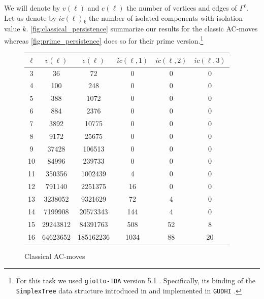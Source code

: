 We will denote by $v(\ell)$ and $e(\ell)$ the number of vertices and edges of $\Gamma^\ell$.
Let us denote by $ic(\ell)_k$ the number of isolated components with isolation value $k$.
\autoref{fig:classical_persistence} summarize our results for the classic AC-moves whereas \autoref{fig:prime_persistence} does so for their prime version.\footnote{For this task we used \texttt{giotto-TDA} version 5.1 \cite{tauzin2021giotto}.
	Specifically, its binding of the \texttt{SimplexTree} data structure introduced in \cite{boissonnat2014simplex} and implemented in \texttt{GUDHI} \cite{maria2014gudhi}.}

\begin{figure}
	\begin{tabular}{|c|c|c|c|c|c|}
		\hline
		$\ell$ & $v(\ell)$ & $e(\ell)$ & $ic(\ell,1)$ & $ic(\ell,2)$ & $ic(\ell,3)$ \\ \hline
		3 & 36 & 72 & 0 & 0 & 0 \\ \hline
		4 & 100 & 248 & 0 & 0 & 0 \\ \hline
		5 & 388 & 1072 & 0 & 0 & 0 \\ \hline
		6 & 884 & 2376 & 0 & 0 & 0 \\ \hline
		7 & 3892 & 10775 & 0 & 0 & 0 \\ \hline
		8 & 9172 & 25675 & 0 & 0 & 0 \\ \hline
		9 & 37428 & 106513 & 0 & 0 & 0 \\ \hline
		10 & 84996 & 239733 & 0 & 0 & 0 \\ \hline
		11 & 350356 & 1002439 & 4 & 0 & 0 \\ \hline
		12 & 791140 & 2251375 & 16 & 0 & 0 \\ \hline
		13 & 3238052 & 9321629 & 72 & 4 & 0 \\ \hline
		14 & 7199908 & 20573343 & 144 & 4 & 0 \\ \hline
		15 & 29243812 & 84391763 & 508 & 52 & 8 \\ \hline
		16 & 64623652 & 185162236 & 1034 & 88 & 20 \\ \hline
	\end{tabular}
	\caption{Classical AC-moves}
	\label{fig:classical_persistence}
\end{figure}

